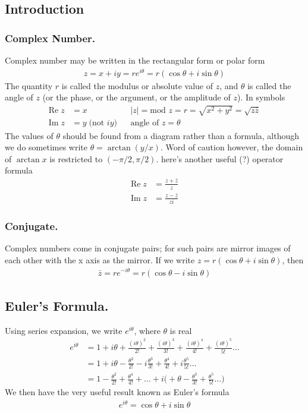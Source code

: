 \documentclass[../../../main.tex]{subfiles}
\begin{document}
\subsection{Introduction}
\subsubsection{Complex Number.} Complex number may be written in the rectangular form or polar form
\begin{align*}
    z=x+i y=re^{i\theta}=r(\cos\theta+i\sin\theta)
\end{align*}
The quantity $r$ is called the modulus or absolute value of $z$, and $\theta$ is called the angle of $z$ (or the phase, or the argument, or the amplitude of $z$). In symbols
\begin{align*}
    \mathrm{Re}\; z&=x&&    |z|=\text{mod } z=r=\sqrt{x^2+y^2}=\sqrt{z\bar{z}}\\
    \mathrm{Im}\; z&=y\;\textrm{(not $iy$)}&&\text{angle of } z=\theta
\end{align*}
The values of $\theta$ should be found from a diagram rather than a formula, although we do sometimes write $\theta = \arctan(y/x)$. Word of caution however, the domain of $\arctan x$ is restricted to $(-\pi/2, \pi/2)$. here's another useful (?) operator formula
\begin{align*}
    \mathrm{Re}\; z&=\frac{z+\bar{z}}{z}\\
    \mathrm{Im}\; z&=\frac{z-\bar{z}}{zi}
\end{align*}

\subsubsection{Conjugate.} Complex numbers come in conjugate pairs; for such pairs are mirror images of each other with the x axis as the mirror. If we write $z = r(\cos \theta + i \sin \theta)$, then
\begin{align*}
    \bar{z}=re^{-i\theta}=r(\cos\theta-i\sin\theta)
\end{align*}

\subsection{Euler's Formula.} Using series expansion, we write $e^{i\theta}$, where $\theta$ is real
\begin{align*}
    e^{i\theta}&=1+i\theta+\frac{(i\theta)^2}{2!}+\frac{(i\theta)^3}{3!}+\frac{(i\theta)^4}{4!}+\frac{(i\theta)^5}{5!}\dots\\
    &=1+i\theta- \frac{\theta^2}{2!}-i\frac{\theta^3}{3!}+\frac{\theta^4}{4!}+i\frac{\theta^5}{5!}\dots\\
    &=1- \frac{\theta^2}{2!}+\frac{\theta^4}{4!}+\dots+i\biggl(+\theta-\frac{\theta^3}{3!}+\frac{\theta^5}{5!}\dots\biggr)
\end{align*}
We then have the very useful result known as Euler's formula
\begin{align*}
    e^{i\theta}=\cos\theta+i\sin\theta\\
\end{align*}
\end{document}
